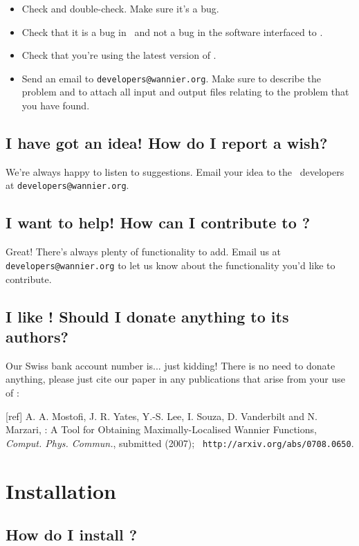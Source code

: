 \begin{itemize}
\item Check and double-check. Make sure it's a bug.
\item Check that it is a bug in \wannier\ and not a bug in the
  software interfaced to \wannier.
\item Check that you're using the latest version of \wannier.
\item Send an email to {\tt developers@wannier.org}. Make sure to
  describe the problem and to attach all input and output files
  relating to the problem that you have found.
\end{itemize}

\subsection{I have got an idea! How do I report a wish?}

We're always happy to listen to suggestions. Email your idea to the
  \wannier\ developers at {\tt developers@wannier.org}.

\subsection{I want to help! How can I contribute to \wannier?}

Great! There's always plenty of functionality to add. Email us at {\tt
  developers@wannier.org} to let us know about the functionality you'd
  like to contribute. 

\subsection{I like \wannier! Should I donate anything to its authors?}

Our Swiss bank account number is... just kidding! There is no need to
donate anything, please just cite our paper in any publications that
arise from your use of \wannier:

[ref] A. A. Mostofi, J. R. Yates, Y.-S. Lee, I. Souza, D. Vanderbilt
and N. Marzari, \wannier: A Tool for Obtaining Maximally-Localised
Wannier Functions, {\it Comput. Phys. Commun.}, submitted (2007); {\tt
http://arxiv.org/abs/0708.0650}.

\section{Installation}

\subsection{How do I install \wannier?}

